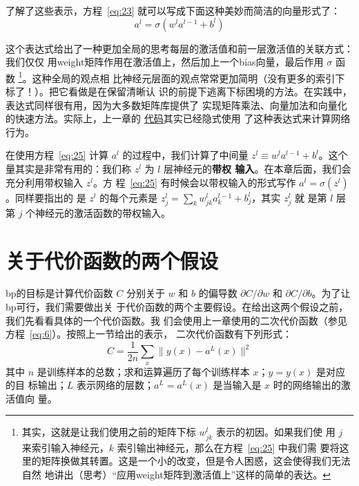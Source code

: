 了解了这些表示，方程~\eqref{eq:23} 就可以写成下面这种美妙而简洁的向量形式了：
\begin{equation}
  a^{l} = \sigma(w^l a^{l-1}+b^l)
  \label{eq:25}\tag{25}
\end{equation}

这个表达式给出了一种更加全局的思考每层的激活值和前一层激活值的关联方式：我们仅仅
用\gls*{weight}矩阵作用在激活值上，然后加上一个\gls*{bias}向量，最后作用
$\sigma$ 函数
\footnote{其实，这就是让我们使用之前的矩阵下标 $w_{jk}^l$ 表示的初因。如果我们使
  用 $j$ 来索引输入神经元，$k$ 索引输出神经元，那么在方程~\eqref{eq:25} 中我们需
  要将这里的矩阵换做其转置。这是一个小的改变，但是令人困惑，这会使得我们无法自然
  地讲出（思考）“应用\gls*{weight}矩阵到激活值上”这样的简单的表达。}。这种全局的观点相
比神经元层面的观点常常更加简明（没有更多的索引下标了！）。把它看做是在保留清晰认
识的前提下逃离下标困境的方法。在实践中，表达式同样很有用，因为大多数矩阵库提供了
实现矩阵乘法、向量加法和向量化的快速方法。实际上，上一章的%
\hyperref[sec:implementing_our_network_to_classify_digits]{代码}其实已经隐式使用
了这种表达式来计算网络行为。

在使用方程~\eqref{eq:25} 计算 $a^l$ 的过程中，我们计算了中间量 $z^l \equiv w^l
a^{l-1}+b^l$。这个量其实是非常有用的：我们称 $z^l$ 为 $l$ 层神经元的\textbf{带权
  输入}。在本章后面，我们会充分利用带权输入 $z^l$。方
程~\eqref{eq:25} 有时候会以带权输入的形式写作 $a^l = \sigma(z^l)$。同样要指出的
是 $z^l$ 的每个元素是 $z^l_j = \sum_k w^l_{jk} a^{l-1}_k+b^l_j$，其实 $z^l_j$ 就
是第 $l$ 层第 $j$ 个神经元的激活函数的带权输入。

\section{关于代价函数的两个假设}
\label{sec:TwoAssumptionsWeNeedAboutTheCostFunction}

\gls*{bp}的目标是计算代价函数 $C$ 分别关于 $w$ 和 $b$ 的偏导数 $\partial
C/\partial w$ 和 $\partial C / \partial b$。为了让\gls*{bp}可行，我们需要做出关
于代价函数的两个主要假设。在给出这两个假设之前，我们先看看具体的一个代价函数。我
们会使用上一章使用的二次代价函数（参见方程~\eqref{eq:6}）。按照上一节给出的表示，
二次代价函数有下列形式：
\begin{equation}
  C = \frac{1}{2n} \sum_x \|y(x)-a^L(x)\|^2
  \label{eq:26}\tag{26}
\end{equation}
其中 $n$ 是训练样本的总数；求和运算遍历了每个训练样本 $x$；$y = y(x)$ 是对应的目
标输出；$L$ 表示网络的层数；$a^L = a^L(x)$ 是当输入是 $x$ 时的网络输出的激活值向
量。

